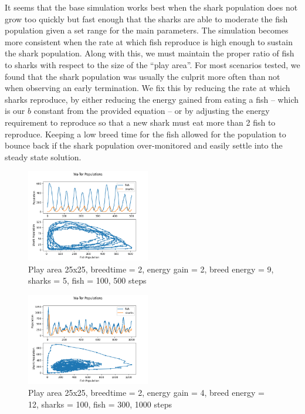 \documentclass[12pt]{iopart} %
\begin{document}
It seems that the base simulation works best when the shark population does not grow too quickly but fast enough that the sharks are able to moderate the fish population given a set range for the main parameters. 
The simulation becomes more consistent when the rate at which fish reproduce is high enough to sustain the shark population. 
Along with this, we must maintain the proper ratio of fish to sharks with respect to the size of the “play area”. 
For most scenarios tested, we found that the shark population was usually the culprit more often than not when observing an early termination. 
We fix this by reducing the rate at which sharks reproduce, by either reducing the energy gained from eating a fish – which is our $b$ constant from the provided equation – or by adjusting the energy requirement to reproduce so that a new shark must eat more than 2 fish to reproduce. 
Keeping a low breed time for the fish allowed for the population to bounce back if the shark population over-monitored and easily settle into the steady state solution.

\begin{figure}[h!tbp]
  \begin{center}
  \item[]\includegraphics[width=0.48\textwidth]{figure11.png}
  \caption{\label{fig:figure11}
  Play area 25x25, breedtime = 2, energy gain = 2, breed energy = 9, sharks = 5, fish = 100, 500 steps
  }
  \end{center}
\end{figure}

\begin{figure}[h!tbp]
  \begin{center}
  \item[]\includegraphics[width=0.48\textwidth]{figure12.png}
  \caption{\label{fig:figure12}
  Play area 25x25, breedtime = 2, energy gain = 4, breed energy = 12, sharks = 100, fish = 300, 1000 steps
  }
  \end{center}
\end{figure}
\end{document}
